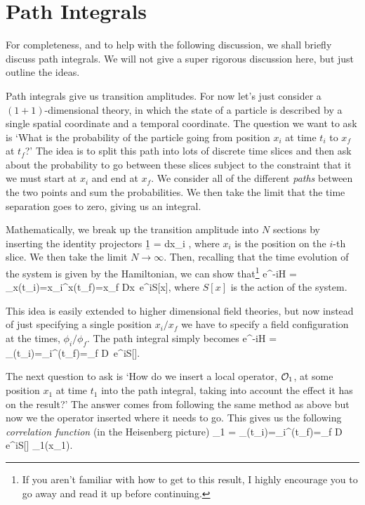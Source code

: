 \section{Path Integrals}

For completeness, and to help with the following discussion, we shall briefly discuss path integrals. We will not give a super rigorous discussion here, but just outline the ideas. 

Path integrals give us transition amplitudes. For now let's just consider a $(1+1)$-dimensional theory, in which the state of a particle is described by a single spatial coordinate and a temporal coordinate. The question we want to ask is `What is the probability of the particle going from position $x_i$ at time $t_i$ to $x_f$ at $t_f$?' The idea is to split this path into lots of discrete time slices and then ask about the probability to go between these slices subject to the constraint that it we must start at $x_i$ and end at $x_f$. We consider all of the different \textit{paths} between the two points and sum the probabilities. We then take the limit that the time separation goes to zero, giving us an integral. 

Mathematically, we break up the transition amplitude into $N$ sections by inserting the identity projectors 
\be
\label{eqn:BasesStates}
    \b1 = \int dx_i ,
\ee 
where $x_i$ is the position on the $i$-th slice. We then take the limit $N\to\infty$. Then, recalling that the time evolution of the system is given by the Hamiltonian, we can show that\footnote{If you aren't familiar with how to get to this result, I highly encourage you to go away and read it up before continuing.} 
\bse 
     e^{-iH} = \int_{x(t_i)=x_i}^{x(t_f)=x_f} Dx\, e^{iS[x]},
\ese 
where $S[x]$ is the action of the system. 

This idea is easily extended to higher dimensional field theories, but now instead of just specifying a single position $x_i/x_f$ we have to specify a field configuration at the times, $\phi_i/\phi_f$. The path integral simply becomes 
\bse 
     e^{-iH} = \int_{\phi(t_i)=\phi_i}^{\phi(t_f)=\phi_f} D\phi \, e^{iS[\phi]}.
\ese 

The next question to ask is `How do we insert a local operator, $\mathcal{O}_1$, at some position $x_1$ at time $t_1$ into the path integral, taking into account the effect it has on the result?' The answer comes from following the same method as above but now we the operator inserted where it needs to go. This gives us the following \textit{correlation function} (in the Heisenberg picture) 
\bse 
     \cO_1  = \int_{\phi(t_i)=\phi_i}^{\phi(t_f)=\phi_f} D\phi \, e^{iS[\phi]} \cO_1(x_1).
\ese 


